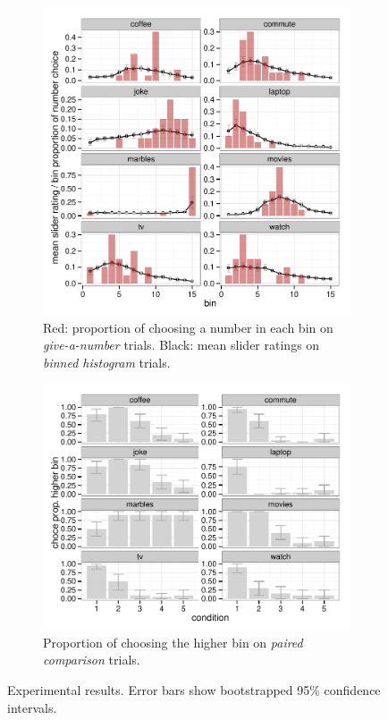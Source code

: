 \documentclass[10pt,letterpaper]{article}
\begin{document}
\begin{figure}
  \centering
  \begin{subfigure}[b]{0.5\textwidth}
    \includegraphics[width = \textwidth]{plots/data_sliderNumber.pdf}
    \caption{Red: proportion of choosing a number in each bin on \emph{give-a-number} trials. Black: mean slider ratings on \emph{binned histogram} trials.}
    \label{fig:slider}
  \end{subfigure}

  \begin{subfigure}[b]{0.5\textwidth}
    \includegraphics[width = \textwidth]{plots/data_choice.pdf}
    \caption{Proportion of choosing the higher bin on \emph{paired comparison} trials.}
    \label{fig:lighting}
  \end{subfigure}

  \caption{Experimental results. Error bars show bootstrapped 95\% confidence intervals.}
  \label{fig:Results}
\end{figure}
\end{document}
